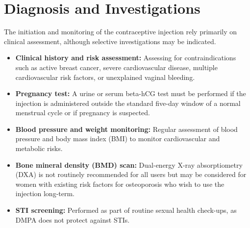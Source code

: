 \section*{Diagnosis and Investigations}
The initiation and monitoring of the contraceptive injection rely primarily on clinical assessment, although selective investigations may be indicated.
\begin{itemize}
    \item \textbf{Clinical history and risk assessment:} Assessing for contraindications such as active breast cancer, severe cardiovascular disease, multiple cardiovascular risk factors, or unexplained vaginal bleeding.
    \item \textbf{Pregnancy test:} A urine or serum beta-hCG test must be performed if the injection is administered outside the standard five-day window of a normal menstrual cycle or if pregnancy is suspected.
    \item \textbf{Blood pressure and weight monitoring:} Regular assessment of blood pressure and body mass index (BMI) to monitor cardiovascular and metabolic risks.
    \item \textbf{Bone mineral density (BMD) scan:} Dual-energy X-ray absorptiometry (DXA) is not routinely recommended for all users but may be considered for women with existing risk factors for osteoporosis who wish to use the injection long-term.
    \item \textbf{STI screening:} Performed as part of routine sexual health check-ups, as DMPA does not protect against STIs.
\end{itemize}

